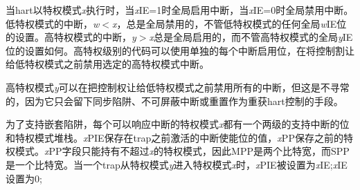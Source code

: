\iffalse
When a hart is executing in privilege mode {\em x}, interrupts are
globally enabled when {\em x}\/IE=1 and globally disabled when {\em
  x}\/IE=0.  Interrupts for lower-privilege modes, {\em w}$<${\em x},
are always globally disabled regardless of the setting of any global
{\em w}\/IE bit for the lower-privilege mode.
Interrupts for
higher-privilege modes, {\em y}$>${\em x}, are always globally enabled
regardless of the setting of the global {\em y}\/IE bit for the
higher-privilege mode.
Higher-privilege-level code can use separate
per-interrupt enable bits to disable selected higher-privilege-mode
interrupts before ceding control to a lower-privilege mode.
\fi

当hart以特权模式{\em x}执行时，当{\em x}\/IE=1时全局启用中断，当{\em x}\/IE=0时全局禁用中断。低特权模式的中断，{\em w}$<${\em x}，总是全局禁用的，不管低特权模式的任何全局{\em w}\/IE位的设置。高特权模式的中断，{\em y}$>${\em x}总是全局启用的，而不管高特权模式的全局{\em y}\/IE位的设置如何。高特权级别的代码可以使用单独的每个中断启用位，在将控制割让给低特权模式之前禁用选定的高特权模式中断。

\iffalse
\begin{commentary}
  A higher-privilege mode {\em y} could disable all of its interrupts
  before ceding control to a lower-privilege mode but this would be
  unusual as it would leave only a synchronous trap, non-maskable
  interrupt, or reset as means to regain control of the hart.
\end{commentary}
\fi

\begin{commentary}
高特权模式{\em y}可以在把控制权让给低特权模式之前禁用所有的中断，但这是不寻常的，因为它只会留下同步陷阱、不可屏蔽中断或重置作为重获hart控制的手段。
\end{commentary}

\iffalse
To support nested traps, each privilege mode {\em x} that can respond to
interrupts has a two-level
stack of interrupt-enable bits and privilege modes.  {\em x}\/PIE
holds the value of the interrupt-enable bit active prior to the trap,
and {\em x}\/PP holds the previous privilege mode.  The {\em x}\/PP
fields can only hold privilege modes up to {\em x}, so MPP is
two bits wide and SPP is one bit wide.  When
a trap is taken from privilege mode {\em y} into privilege mode {\em
  x}, {\em x}\/PIE is set to the value of {\em x}\/IE; {\em x}\/IE is set to
0; and {\em x}\/PP is set to {\em y}.
\fi

为了支持嵌套陷阱，每个可以响应中断的特权模式{\em x}都有一个两级的支持中断的位和特权模式堆栈。{\em x}\/PIE保存在trap之前激活的中断使能位的值，{\em x}\/PP保存之前的特权模式。{\em x}\/PP字段只能持有不超过{\em x}的特权模式，因此MPP是两个比特宽，而SPP是一个比特宽。当一个trap从特权模式{\em y}进入特权模式{\em x}时，{\em x}\/PIE被设置为{\em x}\/IE;{\em x}\/IE设置为0;

